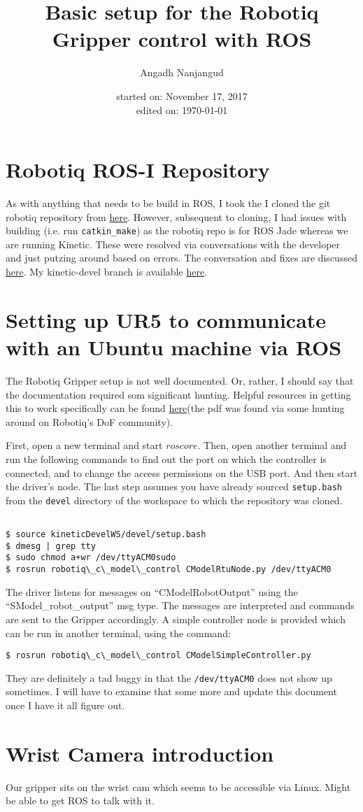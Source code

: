 \documentclass[a4paper]{article}
\title{Basic setup for the Robotiq Gripper control
with ROS}
\author{Angadh Nanjangud}
\date{started on: November 17, 2017\\ edited on: \today}
\begin{document}
\maketitle

\section{Robotiq ROS-I Repository}
As with anything that needs to be build in ROS, I took the 
I cloned the git robotiq repository from
\href{https://github.com/ros-industrial/robotiq}{here}.
However, subsequent to cloning, I had issues with building
(i.e. run \texttt{catkin\_make}) as the robotiq repo is for
ROS Jade whereas we are running Kinetic. These were resolved
via conversations with the developer and just putzing around
based on errors. The conversation and fixes are discussed
\href{https://github.com/ros-industrial/robotiq/issues/116}
{here}. My kinetic-devel branch is available
\href{https://github.com/angadhn/robotiq/tree/kinetic-devel}
{here}.

\section{Setting up UR5 to communicate with an Ubuntu machine
via  ROS}
The Robotiq Gripper setup is not well documented. Or, rather,
I should say that the documentation required som significant
hunting. Helpful resources in getting this to work specifically
can be found
\href{https://us.v-cdn.net/6027406/uploads/editor/g9/o29lnir20s3t.pdf}
{here}(the pdf was found via some hunting around on
Robotiq's DoF community).

First, open a new terminal and start $roscore$.
Then, open another terminal and run the following commands 
to find out the port on which the controller is connected,
and to change the access permissions on the USB port. And
then start the driver's node. The last step assumes you have
already sourced \texttt{setup.bash} from the \texttt{devel}
directory of the workspace to which the repository was cloned.
\begin{lstlisting}

$ source kineticDevelWS/devel/setup.bash
$ dmesg | grep tty
$ sudo chmod a+wr /dev/ttyACM0sudo 
$ rosrun robotiq\_c\_model\_control CModelRtuNode.py /dev/ttyACM0
\end{lstlisting}

The driver listens for messages on ``CModelRobotOutput''
using the ``SModel\_robot\_output'' msg type. The messages
are interpreted and commands are sent to the Gripper accordingly.
A simple controller node is provided which can be run in
another terminal, using the command:
\begin{lstlisting}
$ rosrun robotiq\_c\_model\_control CModelSimpleController.py
\end{lstlisting}
They are definitely a tad buggy in that the
\texttt{/dev/ttyACM0} does not show up sometimes. I will
have to examine that some more and update this document
once I have it all figure out.

\section{Wrist Camera introduction}
Our gripper sits on the wrist cam which seems to be accessible
via Linux. Might be able to get ROS to talk with it.
\end{document}
